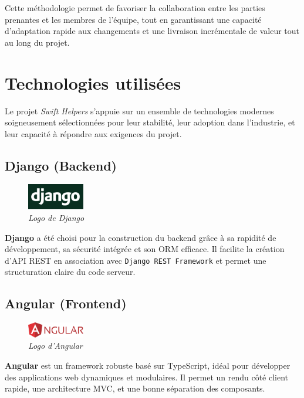 Cette méthodologie permet de favoriser la collaboration entre les parties prenantes et les membres de l'équipe, tout en garantissant une capacité d'adaptation rapide aux changements et une livraison incrémentale de valeur tout au long du projet.
\section*{Technologies utilisées}

Le projet \textit{Swift Helpers} s’appuie sur un ensemble de technologies modernes soigneusement sélectionnées pour leur stabilité, leur adoption dans l’industrie, et leur capacité à répondre aux exigences du projet.

\subsection*{Django (Backend)}
\begin{figure}[H]
\centering
\includegraphics[width=2.5cm]{figures/django.png}
\caption*{\textit{Logo de Django}}
\end{figure}
\noindent
\textbf{Django} a été choisi pour la construction du backend grâce à sa rapidité de développement, sa sécurité intégrée et son ORM efficace. Il facilite la création d’API REST en association avec \texttt{Django REST Framework} et permet une structuration claire du code serveur.

\subsection*{Angular (Frontend)}
\begin{figure}[H]
\centering
\includegraphics[width=2.5cm]{figures/angular.png}
\caption*{\textit{Logo d’Angular}}
\end{figure}
\noindent
\textbf{Angular} est un framework robuste basé sur TypeScript, idéal pour développer des applications web dynamiques et modulaires. Il permet un rendu côté client rapide, une architecture MVC, et une bonne séparation des composants.

